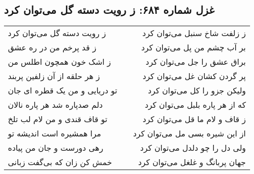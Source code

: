 \begin{center}
\section*{غزل شماره ۶۸۴: ز رویت دسته گل می‌توان کرد}
\label{sec:0684}
\begin{longtable}{l p{0.5cm} r}
ز رویت دسته گل می‌توان کرد
&&
ز زلفت شاخ سنبل می‌توان کرد
\\
ز قد پرخم من در ره عشق
&&
بر آب چشم من پل می‌توان کرد
\\
ز اشک خون همچون اطلس من
&&
براق عشق را جل می‌توان کرد
\\
ز هر حلقه از آن زلفین پربند
&&
پر گردن کشان غل می‌توان کرد
\\
تو دریایی و من یک قطره ای جان
&&
ولیکن جزو را کل می‌توان کرد
\\
دلم صدپاره شد هر پاره نالان
&&
که از هر پاره بلبل می‌توان کرد
\\
تو قاف قندی و من لام لب تلخ
&&
ز قاف و لام ما قل می‌توان کرد
\\
مرا همشیره است اندیشه تو
&&
از این شیره بسی مل می‌توان کرد
\\
رهی دورست و جان من پیاده
&&
ولی دل را چو دلدل می‌توان کرد
\\
خمش کن زان که بی‌گفت زبانی
&&
جهان پربانگ و غلغل می‌توان کرد
\\
\end{longtable}
\end{center}
